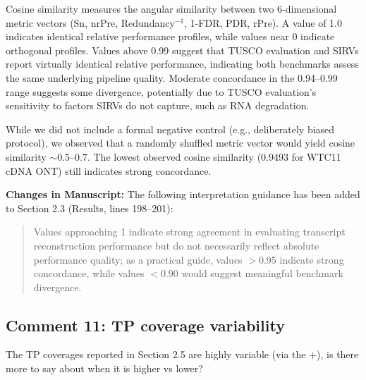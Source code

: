 \documentclass[11pt]{article}
\begin{document}
\begin{responseboxnew}
Cosine similarity measures the angular similarity between two 6-dimensional metric vectors (Sn, nrPre, Redundancy$^{-1}$, 1-FDR, PDR, rPre). A value of 1.0 indicates identical relative performance profiles, while values near 0 indicate orthogonal profiles. Values above 0.99 suggest that TUSCO evaluation and SIRVs report virtually identical relative performance, indicating both benchmarks assess the same underlying pipeline quality. Moderate concordance in the 0.94--0.99 range suggests some divergence, potentially due to TUSCO evaluation's sensitivity to factors SIRVs do not capture, such as RNA degradation.

While we did not include a formal negative control (e.g., deliberately biased protocol), we observed that a randomly shuffled metric vector would yield cosine similarity $\sim$0.5--0.7. The lowest observed cosine similarity (0.9493 for WTC11 cDNA ONT) still indicates strong concordance.

\vspace{0.3cm}
\textbf{Changes in Manuscript:} The following interpretation guidance has been added to Section 2.3 (Results, lines 198--201):

\begin{quote}
Values approaching 1 indicate strong agreement in evaluating transcript reconstruction performance but do not necessarily reflect absolute performance quality; as a practical guide, values $>$0.95 indicate strong concordance, while values $<$0.90 would suggest meaningful benchmark divergence.
\end{quote}
\end{responseboxnew}

\subsection{Comment 11: TP coverage variability}

\begin{reviewercomment}
The TP coverages reported in Section 2.5 are highly variable (via the +), is there more to say about when it is higher vs lower?
\end{reviewercomment}
\end{document}
